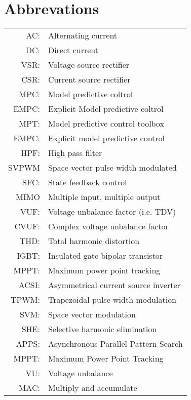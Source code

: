 \chapter*{Abbrevations}
\begin{longtable}{r l}
	AC:				& Alternating current\\
	DC:				& Direct current\\
  VSR:      & Voltage source rectifier \\
  CSR:      & Current source rectifier \\
  MPC:      & Model predictive coltrol\\
	EMPC:      & Explicit Model predictive coltrol\\
  MPT:      & Model predictive control toolbox\\
  EMPC:     & Explicit model predictive control\\
  HPF:      & High pass filter\\
  SVPWM     & Space vector pulse width modulated\\
  SFC:      & State feedback control\\
	MIMO			& Multiple input, multiple output\\
  VUF:      & Voltage unbalance factor (i.e. TDV)\\
	CVUF:			& Complex voltage unbalance factor\\
  THD:      & Total harmonic distortion\\
  IGBT:     & Insulated gate bipolar transistor\\
  MPPT:     & Maximum power point tracking\\
	ACSI:			& Asymmetrical current source inverter\\
	TPWM:			& Trapezoidal pulse width modulation\\
	SVM:			& Space vector modulation\\
	SHE:			& Selective harmonic elimination\\
	APPS:			& Asynchronous Parallel Pattern Search\\
	MPPT:			& Maximum Power Point Tracking\\
VU:          &Voltage unbalance\\
MAC:        & Multiply and accumulate\\

\end{longtable} 